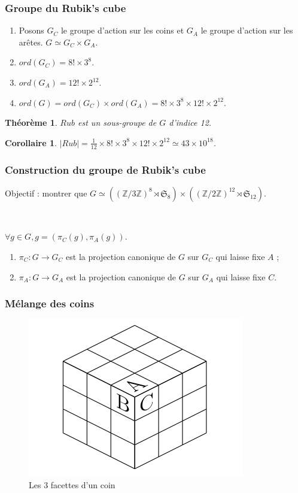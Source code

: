 \documentclass[10pt,notheorems]{beamer}
\theoremstyle{plain}
\newtheorem{theorem}{Théorème}[section]
\theoremstyle{definition}
\theoremstyle{plain}
\theoremstyle{plain}
\theoremstyle{plain}
\newtheorem{corollary}{Corollaire}
\theoremstyle{remark}
\begin{document}
\begin{frame}
  \frametitle{Groupe du Rubik's cube}
  \begin{enumerate}
    \item Posons $G_C$ le groupe d'action sur les coins et $G_A$ le groupe d'action sur les arêtes.
    $G \simeq G_C \times G_A$.
    \item $ord( G_C ) = 8! \times 3 ^{8}$.
    \item $ord( G_A ) = 12! \times 2 ^{12}$.
    \item $ord( G ) = ord( G_C ) \times ord( G_A ) =8! \times 3 ^{8} \times 12! \times 2 ^{12}$.
  \end{enumerate}

  \begin{theorem}
    $Rub$ est un sous-groupe de $G$ d'indice 12.
  \end{theorem}

  \begin{corollary}
    $\mid Rub \mid = \frac{1}{12} \times 8! \times 3 ^{8} \times 12! \times 2 ^{12} \simeq 43 \times 10 ^{18}$.
  \end{corollary}
\end{frame}

\begin{frame}
  \frametitle{Construction du groupe de Rubik's cube}
  Objectif : montrer que $G \simeq ((\mathbb{Z}/{ 3 }\mathbb{Z}) ^{8} \rtimes \mathfrak{S}_{8} ) \times ((\mathbb{Z}/{ 2 }\mathbb{Z}) ^{12} \rtimes \mathfrak{S}_{12} )$.

  \

  $\forall g \in G, g= (\pi_C(g), \pi_A(g))$.

  \begin{enumerate}
    \item $\pi_C : G \to G_C$ est la projection canonique de $G$ sur $G_C$ qui laisse fixe $A$ ;
    \item $\pi_A : G \to G_A$ est la projection canonique de $G$ sur $G_A$ qui laisse fixe $C$.
  \end{enumerate}
\end{frame}

\begin{frame}
  \frametitle{Mélange des coins}
  \begin{figure}
    \centering
    \includegraphics[scale=0.3]{figures/cube_coin.png}
    \caption{Les 3 facettes d'un coin}
    \label{cube_coin}
  \end{figure}
\end{frame}
\end{document}
